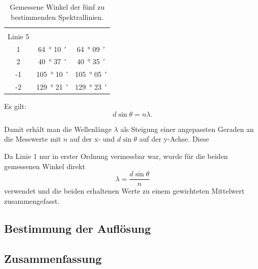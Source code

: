 \documentclass[12pt,a4paper]{article}
\begin{document}
\begin{table}
\begin{tabular}{|c|c|c|}
		&&\\
		Linie 5&&\\
		\hline
		1 & \SI{64}{\degree} \SI{10}{\arcminute} & \SI{64}{\degree} \SI{09}{\arcminute} \\
		\hline
		2 & \SI{40}{\degree} \SI{37}{\arcminute} & \SI{40}{\degree} \SI{35}{\arcminute} \\
		\hline
		-1 & \SI{105}{\degree} \SI{10}{\arcminute} & \SI{105}{\degree} \SI{05}{\arcminute} \\
		\hline
		-2 & \SI{129}{\degree} \SI{21}{\arcminute} & \SI{129}{\degree} \SI{23}{\arcminute} \\
		\hline
		
		
	\end{tabular}
	\caption{Gemessene Winkel der fünf zu bestimmenden Spektrallinien.}
	\label{tab:rohdaten_wellenlängen}
\end{table}
Es gilt:
\begin{equation}
d \sin \theta = n \lambda.
\end{equation}

Damit erhält man die Wellenlänge $\lambda$ als Steigung einer angepassten Geraden an die Messwerte mit $n$ auf der x- und $d \sin \theta$ auf der y-Achse. Diese

Da Linie 1 nur in erster Ordnung vermessbar war, wurde für die beiden gemessenen Winkel direkt
\begin{equation}
\lambda = \frac{d \sin \theta}{n}
\end{equation}
verwendet und die beiden erhaltenen Werte zu einem gewichteten Mittelwert zusammengefasst.


\subsection{Bestimmung der Auflösung}

\subsection{Zusammenfassung}
\end{document}
